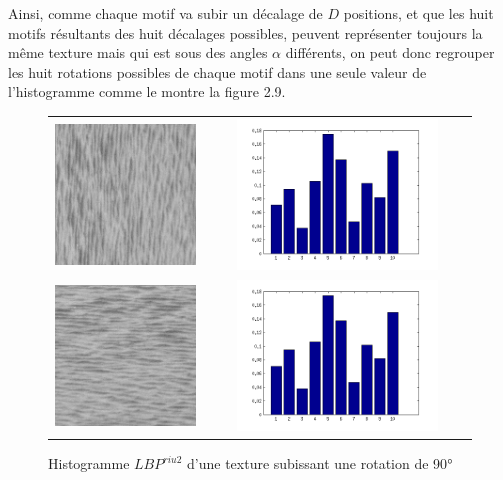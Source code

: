 \indent Ainsi, comme chaque motif va subir un décalage de $D$ positions, et que les huit motifs résultants des huit décalages possibles, peuvent représenter toujours la même texture mais qui est sous des angles $\alpha$ différents, on peut donc regrouper les huit rotations possibles de chaque motif dans une seule valeur de l'histogramme comme le montre la figure 2.9.


\begin{figure}[H]
\centering
\begin{tabular}{cc}
\centering

\includegraphics[width=5cm,height=4cm]{Figures/chap2/p4.png}
&
\includegraphics[width=9cm,height=4cm]{Figures/chap2/riu2a.png}\\

\includegraphics[width=5cm,height=4cm]{Figures/chap2/p5.png}
&
\includegraphics[width=9cm,height=4cm]{Figures/chap2/riu2b.png}\\
\end{tabular}
\caption[comp2]{Histogramme $LBP^{riu2}$ d'une texture subissant une rotation de 90$\si{\degree}$}
\end{figure}

